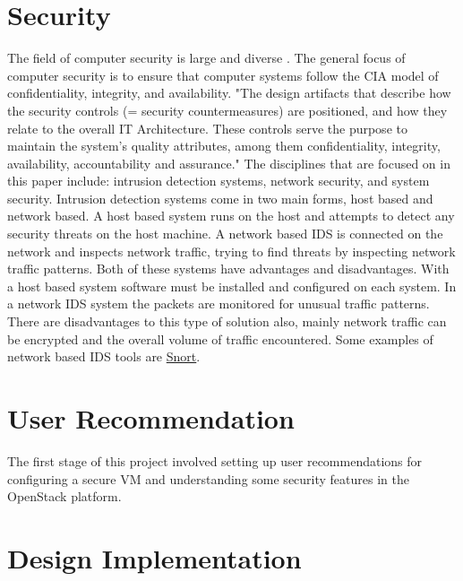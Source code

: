 \documentclass[12pt]{article}
\begin{document}

\section{Security}
The field of computer security is large and diverse \cite{ComputerSecurity}. The general focus of computer security is to ensure that computer systems follow the CIA model of confidentiality, integrity, and availability. "The design artifacts that describe how the security controls (= security countermeasures) are positioned, and how they relate to the overall IT Architecture. These controls serve the purpose to maintain the system's quality attributes, among them confidentiality, integrity, availability, accountability and assurance." \cite{it_security_architecture} The disciplines that are focused on in this paper include: intrusion detection systems, network security, and system security.
Intrusion detection systems come in two main forms, host based and network based. A host based system runs on the host and attempts to detect any security threats on the host machine. A network based IDS is connected on the network and inspects network traffic, trying to find threats by inspecting network traffic patterns. Both of these systems have advantages and disadvantages. With a host based system software must be installed and configured on each system. In a network IDS system the packets are monitored for unusual traffic patterns. There are disadvantages to this type of solution also, mainly network traffic can be encrypted and the overall volume of traffic encountered. Some examples of network based IDS tools are \href{https://www.snort.org/}{Snort}.


\section{User Recommendation}
The first stage of this project involved setting up user recommendations for configuring a secure VM and understanding some security features in the OpenStack platform.

\section{Design Implementation}


\newpage


\end{document}
